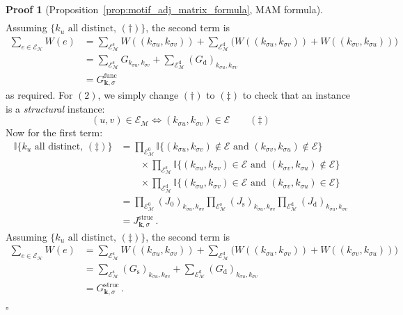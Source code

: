 \documentclass[12pt,draft]{ociamthesis}
\theoremstyle{plain}
\theoremstyle{definition}
\newtheorem{prf}{Proof}[chapter]
\theoremstyle{remark}
\newcommand\bb[1]{\mathbb{#1}}
\newcommand\ca[1]{\mathcal{#1}}
\begin{document}
\begin{prf}[Proposition~\ref{prop:motif_adj_matrix_formula}, MAM formula]
\begin{align*}
  \end{align*}
  Assuming $\big\{ k_u \textrm{ all distinct}, \, (\dagger) \big\}$, the second
  term is
  \begin{align*}
    \sum_{e \in \ca{E_H}} W(e)
    &= \sum_{\ca{E}_\ca{M}^\mathrm{s}} W((k_{\sigma u},k_{\sigma v}))
    + \sum_{\ca{E}_\ca{M}^\mathrm{d}} \big( W((k_{\sigma u},k_{\sigma v})) +
    W((k_{\sigma v},k_{\sigma u})) \big) \\
    &= \sum_{\ca{E}_\ca{M}^\mathrm{s}} G_{k_{\sigma u},k_{\sigma v}}
    + \sum_{\ca{E}_\ca{M}^\mathrm{d}} (G_\mathrm{d})_{k_{\sigma u},k_{\sigma
    v}} \\
    &= G^\mathrm{func}_{\mathbf{k},\sigma}
  \end{align*}
  as required. For $(2)$, we simply change $(\dagger)$ to $(\ddagger)$ to check
  that an instance is a \emph{structural} instance:
  $$ (u,v) \in \ca{E_M} \iff (k_{\sigma u}, k_{\sigma v}) \in \ca{E} \qquad
  (\ddagger) $$
  Now for the first term:
  \begin{align*}
    \bb{I} \big\{ k_u \textrm{ all distinct}, \, (\ddagger) \big\}
    &= \prod_{\ca{E}_\ca{M}^0} \bb{I} \{(k_{\sigma u}, k_{\sigma v}) \notin
    \ca{E} \textrm{ and } (k_{\sigma v}, k_{\sigma u}) \notin \ca{E}\} \\
    & \qquad \times \prod_{\ca{E}_\ca{M}^\mathrm{s}} \bb{I} \{(k_{\sigma u},
      k_{\sigma v}) \in \ca{E} \textrm{ and } (k_{\sigma v}, k_{\sigma u})
      \notin
    \ca{E}\} \\
    & \qquad \times \prod_{\ca{E}_\ca{M}^\mathrm{d}} \bb{I} \{(k_{\sigma u},
      k_{\sigma v}) \in \ca{E} \textrm{ and } (k_{\sigma v}, k_{\sigma u}) \in
    \ca{E}\} \\
    &= \prod_{\ca{E}_\ca{M}^0} (J_\mathrm{0})_{k_{\sigma u},k_{\sigma v}}
    \prod_{\ca{E}_\ca{M}^\mathrm{s}} (J_\mathrm{s})_{k_{\sigma u},k_{\sigma v}}
    \prod_{\ca{E}_\ca{M}^\mathrm{d}} (J_\mathrm{d})_{k_{\sigma u},k_{\sigma v}}
    \\
    &= J^\mathrm{struc}_{\mathbf{k},\sigma}\,.
  \end{align*}
  Assuming $\big\{ k_u \textrm{ all distinct}, \, (\ddagger) \big\}$, the
  second term is
  \begin{align*}
    \sum_{e \in \ca{E_H}} W(e)
    &= \sum_{\ca{E}_\ca{M}^\mathrm{s}} W((k_{\sigma u},k_{\sigma v}))
    + \sum_{\ca{E}_\ca{M}^\mathrm{d}} \big( W((k_{\sigma u},k_{\sigma v})) +
    W((k_{\sigma v},k_{\sigma u})) \big) \\
    &= \sum_{\ca{E}_\ca{M}^\mathrm{s}} (G_\mathrm{s})_{k_{\sigma u},k_{\sigma
    v}}
    + \sum_{\ca{E}_\ca{M}^\mathrm{d}} (G_\mathrm{d})_{k_{\sigma u},k_{\sigma
    v}} \\
    &= G^\mathrm{struc}_{\mathbf{k},\sigma}\,.
  \end{align*}

  \hfill $\square$
\end{prf}
\end{document}
